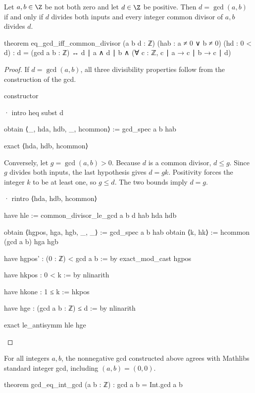 \begin{theorem} \label{nt:thm:gcd-divisibility-characterization}
  Let $a,b\in\Z$ be not both zero and let $d\in\Z$ be positive. Then $d=\gcd(a,b)$ if and only if $d$ divides both inputs and every integer common divisor of $a,b$ divides $d$.

  \begin{lean}
    theorem eq_gcd_iff_common_divisor (a b d : ℤ) (hab : a ≠ 0 ∨ b ≠ 0)
        (hd : 0 < d) :
        d = (gcd a b : ℤ) ↔
          d ∣ a ∧ d ∣ b ∧ (∀ c : ℤ, c ∣ a → c ∣ b → c ∣ d)
  \end{lean}
\end{theorem}

\begin{proof}
  If $d=\gcd(a,b)$, all three divisibility properties follow from the construction of the gcd.

  \begin{lean}
    constructor

    · intro heq
      subst d

      obtain ⟨_, hda, hdb, _, hcommon⟩ := gcd_spec a b hab

      exact ⟨hda, hdb, hcommon⟩
  \end{lean}
  Conversely, let $g=\gcd(a,b)>0$. Because $d$ is a common divisor, $d\le g$. Since $g$ divides both inputs, the last hypothesis gives $d=gk$. Positivity forces the integer $k$ to be at least one, so $g\le d$. The two bounds imply $d=g$.

  \begin{lean}
    · rintro ⟨hda, hdb, hcommon⟩

      have hle := common_divisor_le_gcd a b d hab hda hdb

      obtain ⟨hgpos, hga, hgb, _, _⟩ := gcd_spec a b hab
      obtain ⟨k, hk⟩ := hcommon (gcd a b) hga hgb

      have hgpos' : (0 : ℤ) < gcd a b := by
        exact_mod_cast hgpos

      have hkpos : 0 < k := by
        nlinarith

      have hkone : 1 ≤ k := hkpos

      have hge : (gcd a b : ℤ) ≤ d := by
        nlinarith

      exact le_antisymm hle hge
  \end{lean}
\end{proof}

\begin{lemma} \label{nt:lem:gcd-eq-int-gcd}
  For all integers $a,b$, the nonnegative gcd constructed above agrees with Mathlib\textquotesingle s standard integer gcd, including $(a,b)=(0,0)$.

  \begin{lean}
    theorem gcd_eq_int_gcd (a b : ℤ) : gcd a b = Int.gcd a b
  \end{lean}
\end{lemma}

